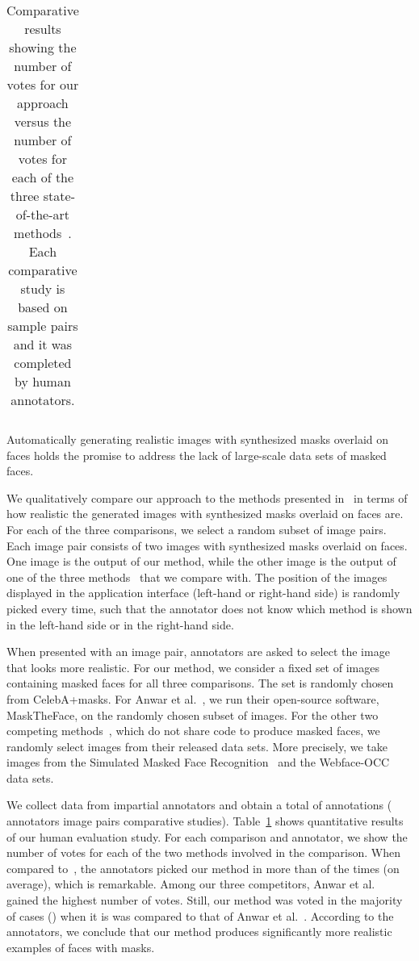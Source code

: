 \documentclass{article}
\begin{document}
\begin{table}
\begin{center}
\begin{tabular}{|l|c|c|c|}
\hline
\end{tabular}
\end{center}
\caption{Comparative results showing the number of votes for our approach versus the number of votes for each of the three state-of-the-art methods~\cite{wang2020arxiv,anwar2020arxiv,huang2021icassp}. Each comparative study is based on  sample pairs and it was completed by  human annotators.} 
\label{tab:quality_assessment}
\end{table} 

Automatically generating realistic images with synthesized masks overlaid on faces holds the promise to address the lack of large-scale data sets of masked faces.


We qualitatively compare our approach to the methods presented in~\cite{wang2020arxiv, anwar2020arxiv, huang2021icassp} in terms of how realistic the generated images with synthesized masks overlaid on faces are. For each of the three comparisons, we select a random subset of  image pairs. Each image pair consists of two images with synthesized masks overlaid on faces. One image is the output of our method, while the other image is the output of one of the three methods~\cite{wang2020arxiv, anwar2020arxiv, huang2021icassp} that we compare with. The position of the images displayed in the application interface (left-hand or right-hand side) is randomly picked every time, such that the annotator does not know which method is shown in the left-hand side or in the right-hand side. 

When presented with an image pair, annotators are asked to select the image that looks more realistic. 
For our method, we consider a fixed set of  images containing masked faces for all three comparisons. The set is randomly chosen from {CelebA+masks}. For Anwar et al.~\cite{anwar2020arxiv}, we run their open-source software, MaskTheFace, on the randomly chosen subset of  images. For the other two competing methods~\cite{wang2020arxiv,huang2021icassp}, which do not share code to produce masked faces, we randomly select  images from their released data sets. 
More precisely, we take images from the Simulated Masked Face Recognition~\cite{wang2020arxiv} and the Webface-OCC~\cite{huang2021icassp} data sets.



We collect data from  impartial annotators and obtain a total of  annotations ( annotators   image pairs   comparative studies). Table~\ref{tab:quality_assessment} shows quantitative results of our human evaluation study. For each comparison and annotator, we show the number of votes for each of the two methods involved in the comparison.
When compared to~\cite{wang2020arxiv,huang2021icassp}, the annotators picked our method in more than  of the times (on average), which is remarkable. Among our three competitors, Anwar et al.~\cite{anwar2020arxiv} gained the highest number of votes. Still, our method was voted in the majority of cases () when it is was compared to that of Anwar et al.~\cite{anwar2020arxiv}. According to the annotators, we conclude that our method produces significantly more realistic examples of faces with masks.
\end{document}
